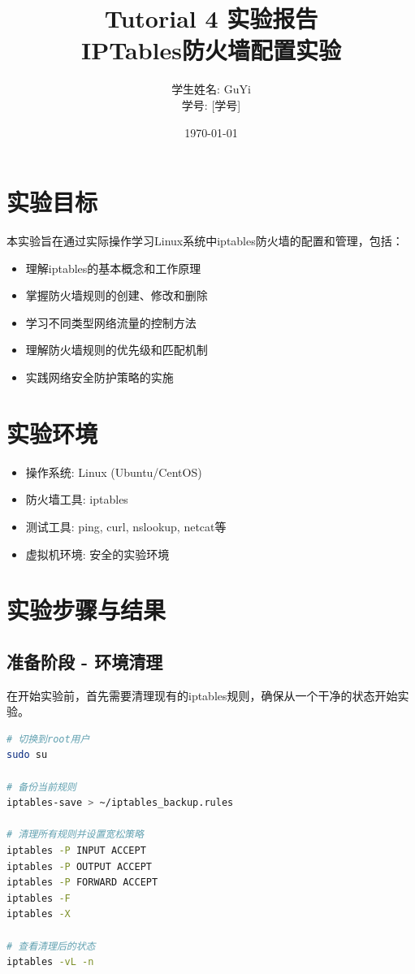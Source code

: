 \documentclass[12pt,a4paper]{article}
\title{\textbf{Tutorial 4 实验报告} \\ IPTables防火墙配置实验}
\author{学生姓名: GuYi \\ 学号: [学号]}
\date{\today}
\begin{document}
\maketitle

\section{实验目标}
本实验旨在通过实际操作学习Linux系统中iptables防火墙的配置和管理，包括：
\begin{itemize}
    \item 理解iptables的基本概念和工作原理
    \item 掌握防火墙规则的创建、修改和删除
    \item 学习不同类型网络流量的控制方法
    \item 理解防火墙规则的优先级和匹配机制
    \item 实践网络安全防护策略的实施
\end{itemize}

\section{实验环境}
\begin{itemize}
    \item 操作系统: Linux (Ubuntu/CentOS)
    \item 防火墙工具: iptables
    \item 测试工具: ping, curl, nslookup, netcat等
    \item 虚拟机环境: 安全的实验环境
\end{itemize}

\section{实验步骤与结果}

\subsection{准备阶段 - 环境清理}

在开始实验前，首先需要清理现有的iptables规则，确保从一个干净的状态开始实验。

\begin{lstlisting}[language=bash, caption=清理iptables规则的命令]
# 切换到root用户
sudo su

# 备份当前规则
iptables-save > ~/iptables_backup.rules

# 清理所有规则并设置宽松策略
iptables -P INPUT ACCEPT
iptables -P OUTPUT ACCEPT
iptables -P FORWARD ACCEPT
iptables -F
iptables -X

# 查看清理后的状态
iptables -vL -n
\end{lstlisting}
\end{document}

